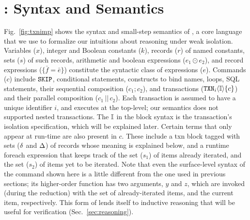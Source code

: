 \section{\txnimp: Syntax and Semantics}
\label{sec:opsem}

\label{sec:syntax}



Fig.~\ref{fig:txnimp} shows the syntax and small-step semantics of
\txnimp, a core language that we use to formalize our intuitions about
reasoning under weak isolation. Variables ($x$), integer and Boolean
constants ($k$), records ($r$) of named constants, sets ($s$) of such
records, arithmetic and boolean expressions ($e_1 \odot e_2$), and
record expressions ($\{\bar{f}=\bar{e}\}$) constitute the syntactic
class of expressions ($e$). Commands ($c$) include ${\tt SKIP}$,
conditional statements,  constructs to bind names, 
loops, SQL statements, their sequential composition ($c_1;c_2$), and
transactions (${\tt TXN}_{i}\langle \mathbb{I} \rangle\{c\}$) and their parallel composition
($c_1\,||\,c_2$). Each transaction is assumed to have a unique
identifier $i$, and executes at the top-level; our semantics does not
supported nested transactions. The $\mathbb{I}$ in the  block syntax is
the transaction's isolation specification, which will be explained
later.  Certain terms that only appear at run-time are also present in
$c$.  These include a {\sf txn} block tagged with sets ($\delta$ and
$\Delta$) of records whose meaning is explained below, and a runtime
{\sf foreach} expression that keeps track of the set ($s_1$) of items
already iterated, and the set ($s_2$) of items yet to be
iterated. Note that even the surface-level syntax of the 
command shown here is a little different from the one used in previous
sections; its higher-order function has two arguments, $y$ and $z$,
which are invoked (during the reduction) with the set of
already-iterated items, and the current item, respectively. This form
of  lends itself to inductive reasoning that will be useful
for verification (Sec.~\ref{sec:reasoning}).


